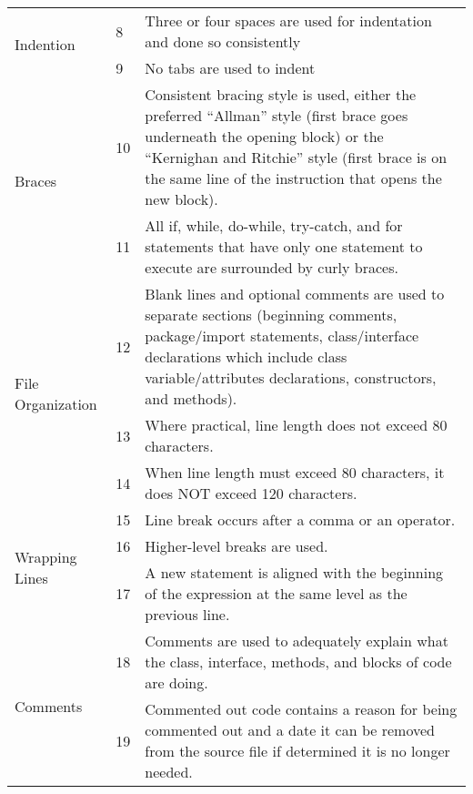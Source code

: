 \documentclass[11pt, a4paper,titlepage]{article}
\begin{document}
						\begin{tabularx}{\textwidth}{| X | l | X |}
							\hline
	\multirow{2}{*}{Indention} 			& \label{itm:8} 8 & 
										Three or four spaces are used for indentation and done so consistently \\	\cline{2-3}
										& \label{itm:9} 9 &  
										No tabs are used to indent	\\ \hline
	\multirow{2}{*}{Braces} 			& \label{itm:10} 10 &  
										Consistent bracing style is used, either the preferred “Allman” style (first
										brace goes underneath the opening block) or the “Kernighan and Ritchie”
										style (first brace is on the same line of the instruction that opens the new
										block).	\\	\cline{2-3}
										& \label{itm:11} 11 &  
										All if, while, do-while, try-catch, and for statements that have only one
										statement to execute are surrounded by curly braces.	\\   \hline
										
	\multirow{3}{*}{File Organization} 	& \label{itm:12} 12 &  
										Blank lines and optional comments are used to separate sections
										(beginning comments, package/import statements, class/interface
										declarations which include class variable/attributes declarations,
										constructors, and methods).\\	\cline{2-3}
										& \label{itm:13} 13 &  
										Where practical, line length does not exceed 80 characters.\\	\cline{2-3}
										& \label{itm:14} 14 &  
										When line length must exceed 80 characters, it does NOT exceed 120
										characters.\\   \hline
	\multirow{3}{*}{Wrapping Lines} 	& \label{itm:15} 15 &  
										Line break occurs after a comma or an operator.\\	\cline{2-3}
										& \label{itm:16} 16 &  
										Higher-level breaks are used.\\	\cline{2-3}
										& \label{itm:17} 17 &  
										A new statement is aligned with the beginning of the expression at the
										same level as the previous line.\\   \hline
	\multirow{2}{*}{Comments} 			& \label{itm:18} 18 &  
										Comments are used to adequately explain what the class, interface,
										methods, and blocks of code are doing.\\	\cline{2-3}
										& \label{itm:19} 19 &  
										Commented out code contains a reason for being commented out and a
										date it can be removed from the source file if determined it is no longer
										needed.\\   \hline
									\end{tabularx}
\end{document}
